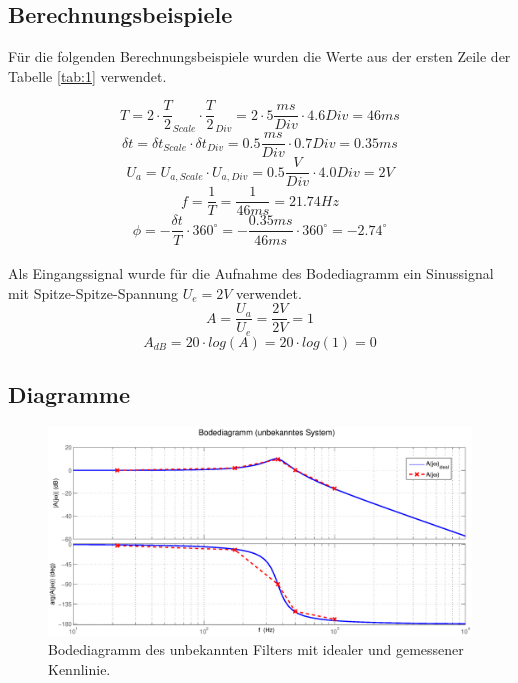 \documentclass[12pt,a4paper,ngerman]{article}
\begin{document}
\subsection{Berechnungsbeispiele}
Für die folgenden Berechnungsbeispiele wurden die Werte aus der ersten Zeile der Tabelle \ref{tab:1} verwendet.

\begin{equation}
T = 2 \cdot \frac{T}{2}_{Scale} \cdot \frac{T}{2}_{Div} = 2 \cdot 5\frac{ms}{Div} \cdot 4.6 Div = 46ms
\end{equation}
\begin{equation}
\delta t = \delta t_{Scale} \cdot \delta t_{Div} = 0.5\frac{ms}{Div} \cdot 0.7Div = 0.35ms
\end{equation}
\begin{equation}
U_a = U_{a,Scale} \cdot U_{a,Div} = 0.5\frac{V}{Div} \cdot 4.0Div = 2V
\end{equation}
\begin{equation}
f = \frac{1}{T} = \frac{1}{46ms} = 21.74Hz
\end{equation}
\begin{equation}
\phi = - \frac{\delta t}{T} \cdot 360^\circ = -\frac{0.35ms}{46ms	} \cdot 360^\circ = -2.74^\circ
\end{equation}\\
Als Eingangssignal wurde für die Aufnahme des Bodediagramm ein Sinussignal mit Spitze-Spitze-Spannung $U_e = 2V$ verwendet.
\begin{equation}
A = \frac{U_a}{U_e} = \frac{2V}{2V} = 1
\end{equation}
\begin{equation}
A_{dB} = 20 \cdot log(A) = 20 \cdot log(1) = 0
\end{equation}


\subsection{Diagramme}
\begin{figure}[H]
\centering
\includegraphics[width=\textwidth]{figures/bode_unbekannt.eps} 
\caption{Bodediagramm des unbekannten Filters mit idealer und gemessener Kennlinie.}
\label{fig:bode_unb}
\end{figure}
\end{document}
